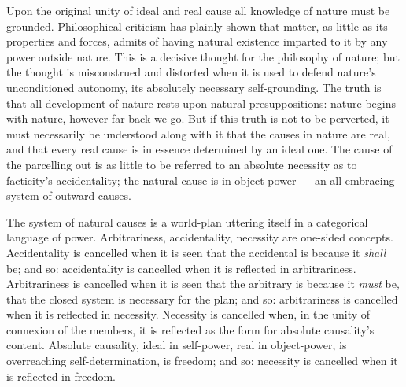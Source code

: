 \documentclass[12pt,a4paper]{book}
\begin{document}
Upon the original unity of ideal and real cause all knowledge of nature must be grounded.
Philosophical criticism has plainly shown that matter, as little as its properties and forces, admits
of having natural existence imparted to it by any power outside nature. This is a decisive thought
for the philosophy of nature; but the thought is misconstrued and distorted when it is used to defend
nature's unconditioned autonomy, its absolutely necessary self-grounding. The truth is that all
development of nature rests upon natural presuppositions: nature begins with nature, however far back
we go. But if this truth is not to
be perverted, it must necessarily be understood along with it that the causes in nature are real, and
that every real cause is in essence determined by an ideal one. The cause of the parcelling out is as
little to be referred to an absolute necessity as to facticity's accidentality; the natural cause is
in object-power --- an all-embracing system of outward causes.

The system of natural causes is a world-plan uttering itself in a categorical language of power.
Arbitrariness, accidentality, necessity are one-sided concepts. Accidentality is cancelled when it is
seen that the
accidental is because it \emph{shall} be; and so: accidentality is cancelled when it is reflected in
arbitrariness. Arbitrariness is cancelled when it is seen that the arbitrary is because it \emph{must}
be, that the closed system is necessary for the plan; and so: arbitrariness is cancelled when it is
reflected in necessity. Necessity is cancelled when, in the unity of connexion of the members, it is
reflected as the form for absolute causality's content. Absolute causality, ideal in self-power, real
in object-power, is overreaching self-determination, is freedom; and so: necessity is cancelled when
it is reflected in freedom.
\end{document}
